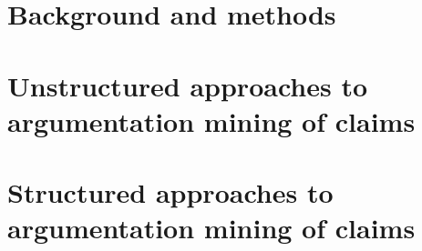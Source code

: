 \documentclass[12pt,oneside, a4paper]{book}
\begin{document}




%




%




\part{Background and methods}





\part{Unstructured approaches to argumentation mining of claims}







\part{Structured approaches to argumentation mining of claims}









\end{document}
